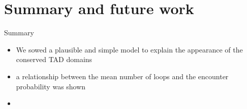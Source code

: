 \documentclass[8pt]{beamer}
\begin{document}
\section{Summary and future work}\label{section_summaryAndFutureWork}
\begin{frame}{Summary}
\begin{itemize}
\item We sowed a plausible and simple model to explain the appearance of the conserved TAD domains 
\item a relationship between the mean number of loops and the encounter probability was shown 
\item 

\end{itemize}
\end{frame}
\end{document}

